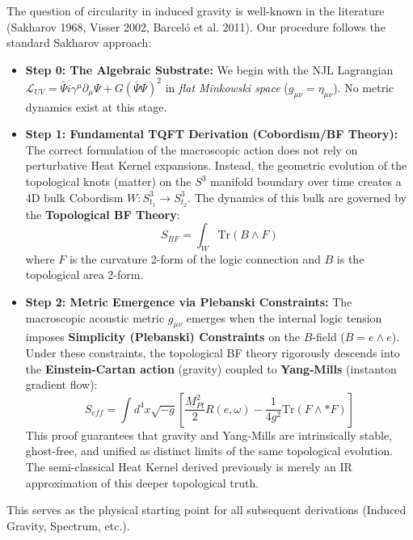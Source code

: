 \documentclass[a4paper,12pt]{article}
\begin{document}
The question of circularity in induced gravity is well-known in the literature (Sakharov 1968, Visser 2002, Barcel\'o et al. 2011). Our procedure follows the standard Sakharov approach:
\begin{itemize}
    \item \textbf{Step 0: The Algebraic Substrate:} We begin with the NJL Lagrangian $\mathcal{L}_{UV} = \bar{\Psi} i \gamma^\mu \partial_\mu \Psi + G(\bar{\Psi}\Psi)^2$ in \emph{flat Minkowski space} ($g_{\mu\nu} = \eta_{\mu\nu}$). No metric dynamics exist at this stage.
    \item \textbf{Step 1: Fundamental TQFT Derivation (Cobordism/BF Theory):} The correct formulation of the macroscopic action does not rely on perturbative Heat Kernel expansions. Instead, the geometric evolution of the topological knots (matter) on the $S^3$ manifold boundary over time creates a 4D bulk Cobordism $W: S^3_{t_1} \to S^3_{t_2}$. The dynamics of this bulk are governed by the \textbf{Topological BF Theory}:
    \begin{equation}
        S_{BF} = \int_W \text{Tr}(B \wedge F)
    \end{equation}
    where $F$ is the curvature 2-form of the logic connection and $B$ is the topological area 2-form.
    \item \textbf{Step 2: Metric Emergence via Plebanski Constraints:} The macroscopic acoustic metric $g_{\mu\nu}$ emerges when the internal logic tension imposes \textbf{Simplicity (Plebanski) Constraints} on the $B$-field ($B = e \wedge e$). Under these constraints, the topological BF theory rigorously descends into the \textbf{Einstein-Cartan action} (gravity) coupled to \textbf{Yang-Mills} (instanton gradient flow):
    \begin{equation}
        S_{eff} = \int d^4x \sqrt{-g} \left[ \frac{M_{Pl}^2}{2} R(e,\omega) - \frac{1}{4g^2} \text{Tr}(F \wedge *F) \right]
    \end{equation}
    This proof guarantees that gravity and Yang-Mills are intrinsically stable, ghost-free, and unified as distinct limits of the same topological evolution. The semi-classical Heat Kernel derived previously is merely an IR approximation of this deeper topological truth.
\end{itemize}
This serves as the physical starting point for all subsequent derivations (Induced Gravity, Spectrum, etc.).
\end{document}
